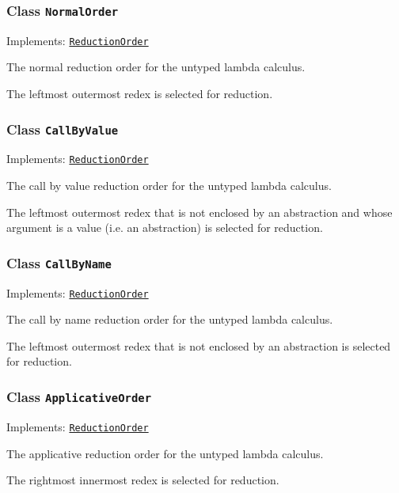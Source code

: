 \subsubsection{Class \texttt{NormalOrder}}
\label{type:edu.kit.wavelength.client.model.reduction.NormalOrder}
Implements: \texttt{\hyperref[type:edu.kit.wavelength.client.model.reduction.ReductionOrder]{ReductionOrder}}

The normal reduction order for the untyped lambda calculus.
 
 The leftmost outermost redex is selected for reduction.

\subsubsection{Class \texttt{CallByValue}}
\label{type:edu.kit.wavelength.client.model.reduction.CallByValue}
Implements: \texttt{\hyperref[type:edu.kit.wavelength.client.model.reduction.ReductionOrder]{ReductionOrder}}

The call by value reduction order for the untyped lambda calculus.
 
 The leftmost outermost redex that is not enclosed by an abstraction
 and whose argument is a value (i.e. an abstraction) is selected for
 reduction.

\subsubsection{Class \texttt{CallByName}}
\label{type:edu.kit.wavelength.client.model.reduction.CallByName}
Implements: \texttt{\hyperref[type:edu.kit.wavelength.client.model.reduction.ReductionOrder]{ReductionOrder}}

The call by name reduction order for the untyped lambda calculus.
 
 The leftmost outermost redex that is not enclosed by an abstraction is
 selected for reduction.

\subsubsection{Class \texttt{ApplicativeOrder}}
\label{type:edu.kit.wavelength.client.model.reduction.ApplicativeOrder}
Implements: \texttt{\hyperref[type:edu.kit.wavelength.client.model.reduction.ReductionOrder]{ReductionOrder}}

The applicative reduction order for the untyped lambda calculus.

 The rightmost innermost redex is selected for reduction.

